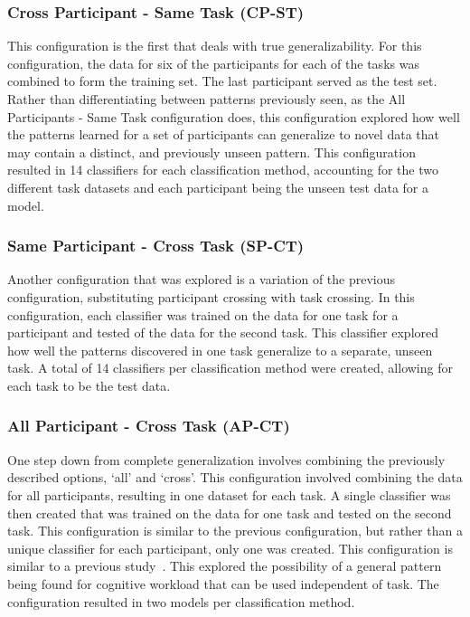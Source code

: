 \documentclass[11pt]{article}
\begin{document}
		\subsubsection{Cross Participant - Same Task (CP-ST)}
		This configuration is the first that deals with true generalizability. For this configuration, the data for six of the participants for each of the tasks was combined to form the training set. The last participant served as the test set. Rather than differentiating between patterns previously seen, as the All Participants - Same Task configuration does, this configuration explored how well the patterns learned for a set of participants can generalize to novel data that may contain a distinct, and previously unseen pattern. This configuration resulted in 14 classifiers for each classification method, accounting for the two different task datasets and each participant being the unseen test data for a model.
		
		\subsubsection{Same Participant - Cross Task (SP-CT)}
		Another configuration that was explored is a variation of the previous configuration, substituting participant crossing with task crossing. In this configuration, each classifier was trained on the data for one task for a participant and tested of the data for the second task. This classifier explored how well the patterns discovered in one task generalize to a separate, unseen task. A total of 14 classifiers per classification method were created, allowing for each task to be the test data.
		
		\subsubsection{All Participant - Cross Task (AP-CT)}
		One step down from complete generalization involves combining the previously described options, `all' and `cross'. This configuration involved combining the data for all participants, resulting in one dataset for each task. A single classifier was then created that was trained on the data for one task and tested on the second task. This configuration is similar to the previous configuration, but rather than a unique classifier for each participant, only one was created. This configuration is similar to a previous study~\cite{Ke}. This explored the possibility of a general pattern being found for cognitive workload that can be used independent of task. The configuration resulted in two models per classification method.
		
\end{document}
